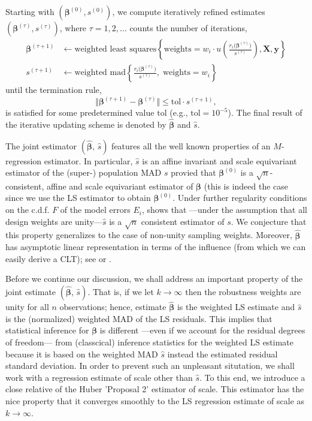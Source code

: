 \documentclass[a4paper,11pt]{scrreprt}
\begin{document}
Starting with $(\bm \beta^{(0)}, s^{(0)})$, we compute iteratively refined estimates $(\bm \beta^{(\tau)}, s^{(\tau)})$, where $\tau=1,2,\ldots$ counts the number of iterations, 
\begin{align*}
   \bm \beta^{(\tau + 1)} &\leftarrow \text{weighted least squares}\left\{ \mathrm{weights} = w_i\cdot u\left( \frac{r_i\big(\bm \beta^{(\tau)}\big)}{s^{(\tau)}}\right), \bm X, \bm y \right\} \\ 
   s^{(\tau + 1)} &\leftarrow \text{weighted mad}\left\{ \frac{r_i\big(\bm \beta^{(\tau)}\big)}{s^{(\tau)}},\; \mathrm{weights}=w_i \right\} 
\end{align*}
\noindent until the termination rule,
\begin{equation*}
   \big\Vert \bm \beta^{(\tau + 1)} - \bm \beta^{(\tau)} \big\Vert \leq \mathrm{tol} \cdot s^{(\tau + 1)},
\end{equation*}
\noindent is satisfied for some predetermined value $\mathrm{tol}$ (e.g., $\mathrm{tol} = 10^{-5}$). The final result of the iterative updating scheme is denoted by $\widehat{\bm \beta}$ and $\widehat{s}$. 

The joint estimator $(\widehat{\bm \beta}, \, \widehat{s})$ features all the well known properties of an $M$-regression estimator. In particular, $\widehat{s}$ is an affine invariant and scale equivariant estimator of the (super-) population MAD $s$ provied that $\bm \beta^{(0)}$ is a $\sqrt{n}$-consistent, affine and scale equivariant estimator of $\bm \beta$ (this is indeed the case since we use the LS estimator to obtain $\bm \beta^{(0)}$. Under further regularity conditions on the c.d.f. $F$ of the model errors $E_i$, \citet{welsh1986} shows that ---under the assumption that all design weights are unity---$\widehat{s}$ is a $\sqrt{n}$ consistent estimator of $s$. We conjecture that this property generalizes to the case of non-unity sampling weights. Moreover, $\widehat{\bm \beta}$ has asymptotic linear representation in terms of the influence (from which we can easily derive a CLT); see \citet{welsh1986} or \citet[][ch. 5]{jureckovasen1996}.

Before we continue our discussion, we shall address an important property of the joint estimate $(\widehat{\bm \beta}, \, \widehat{s})$. That is, if we let $k \rightarrow \infty$ then the robustness weights are unity for all $n$ observations; hence, estimate $\widehat{\bm \beta}$ is the weighted LS estimate and $\widehat{s}$ is the (normalized) weighted MAD of the LS residuals. This implies that statistical inference for $\bm \beta$ is different ---even if we account for the residual degrees of freedom--- from (classcical) inference statistics for the weighted LS estimate because it is based  on the weighted MAD $\widehat{s}$ instead the estimated residual standard deviation. In order to prevent such an unpleasant situtation, we shall work with a regression estimate of scale other than $\widehat{s}$. To this end, we introduce a close relative of the Huber 'Proposal 2' estimator of scale. This estimator has the nice property that it converges smoothly to the LS regression estimate of scale as $k \rightarrow \infty$.  
\end{document}
